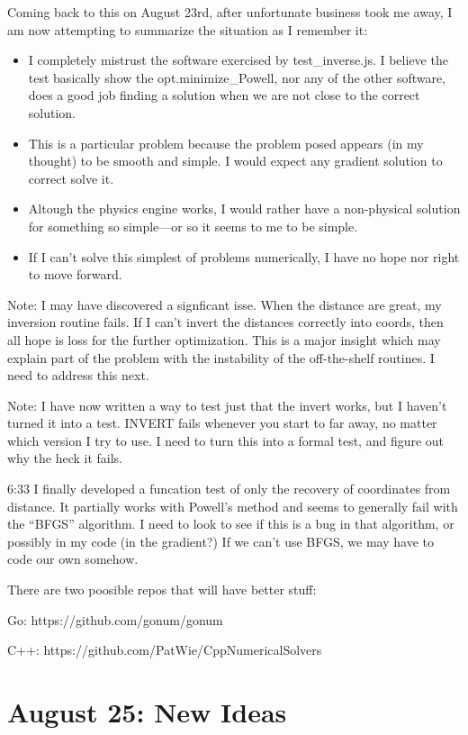 \documentclass[11pt]{article}
\begin{document}
Coming back to this on August 23rd, after unfortunate business took me away, I am now
attempting to summarize the situation as I remember it:
\begin{itemize}
\item I completely mistrust the software exercised by test\_inverse.js. I believe
  the test basically show the opt.minimize\_Powell, nor any of the other software,
  does a good job finding a solution when we are not close to the correct solution.
\item This is a particular problem because the problem posed appears (in my thought)
  to be smooth and simple.  I would expect any gradient solution to correct solve it.
\item Altough the physics engine works, I would rather have a non-physical solution
  for something so simple---or so it seems to me to be simple.
\item If I can't solve this simplest of problems numerically, I have no
  hope nor right to move forward.
\end{itemize}

Note: I may have discovered a signficant isse. When the distance are great,
my inversion routine fails.  If I can't invert the distances correctly into
coords, then all hope is loss for the further optimization.  This is
a major insight which may explain part of the problem with the instability
of the off-the-shelf routines.  I need to address this next.

Note: I have now written a way to test just that the invert works,
but I haven't turned it into a test.  INVERT fails whenever you start
to far away, no matter which version I try to use.  I need to turn this
into a formal test, and figure out why the heck it fails.

6:33 I finally developed a funcation test of only the recovery of
coordinates from distance.  It partially works with Powell's method
and seems to generally fail with the ``BFGS'' algorithm.  I need
to look to see if this is a bug in that algorithm, or possibly in
my code (in the gradient?)  If we can't use BFGS, we may have
to code our own somehow.


There are two poosible repos that will have better stuff:

Go:
https://github.com/gonum/gonum

C++:
https://github.com/PatWie/CppNumericalSolvers

\section{August 25: New Ideas}
\end{document}
